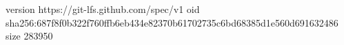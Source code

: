 version https://git-lfs.github.com/spec/v1
oid sha256:687f8f0b322f760ffb6eb434e82370b61702735c6bd68385d1e560d691632486
size 283950

